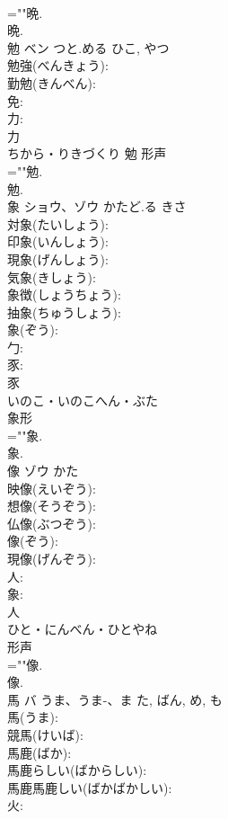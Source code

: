 \documentclass[8pt]{extreport}
\begin{document}
\begin{CJK}{UTF8}{min}
\\	=""晩.
\\	晩.
\\	勉	ベン	つと.める	ひこ, やつ	
\\	勉強(べんきょう): 
\\	勤勉(きんべん): 
\\	免: 
\\	力: 
\\	力	
\\	ちから・りきづくり	勉	形声 
\\	=""勉.
\\	勉.
\\	象	ショウ、ゾウ	かたど.る	きさ	
\\	対象(たいしょう): 
\\	印象(いんしょう): 
\\	現象(げんしょう): 
\\	気象(きしょう): 
\\	象徴(しょうちょう): 
\\	抽象(ちゅうしょう): 
\\	象(ぞう): 
\\	勹: 
\\	豕: 
\\	豕	
\\	いのこ・いのこへん・ぶた	
\\	象形 
\\	=""象.
\\	象.
\\	像	ゾウ		かた	
\\	映像(えいぞう): 
\\	想像(そうぞう): 
\\	仏像(ぶつぞう): 
\\	像(ぞう): 
\\	現像(げんぞう): 
\\	人: 
\\	象: 
\\	人	
\\	ひと・にんべん・ひとやね	
\\	形声 
\\	=""像.
\\	像.
\\	馬	バ	うま、うま-、ま	た, ばん, め, も	
\\	馬(うま): 
\\	競馬(けいば): 
\\	馬鹿(ばか): 
\\	馬鹿らしい(ばからしい): 
\\	馬鹿馬鹿しい(ばかばかしい): 
\\	火: 

\end{CJK}
\end{document}
